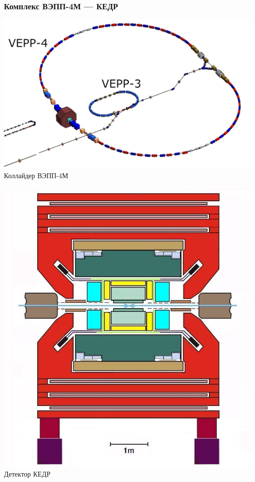 \documentclass[12pt,aspectratio=169]{beamer}
\begin{document}
\begin{frame}
	\frametitle{Комплекс ВЭПП-4М --- КЕДР}
	\begin{minipage}[c]{0.49\linewidth}
		\begin{center}
			\includegraphics[width=1\linewidth]{VEPP-4.pdf}
			\footnotesize{Коллайдер ВЭПП-4М}
		\end{center}
	\end{minipage}
	\begin{minipage}[h]{0.49\linewidth}
		\begin{center}
			\includegraphics[width=0.6\linewidth]{KEDR.jpg}\\
			\footnotesize{Детектор КЕДР}
		\end{center}
		
	\end{minipage}
\end{frame}
\end{document}
